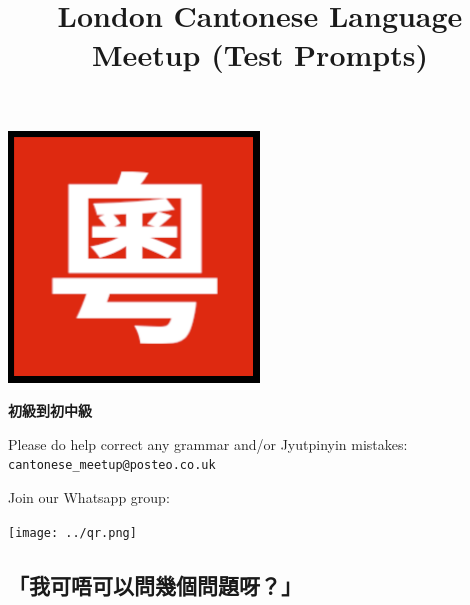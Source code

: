 \documentclass[12pt,a4paper]{leaflet}
\date{}
\title{London Cantonese Language Meetup (Test Prompts)}
\author{}
\begin{document}
\maketitle

\vspace{-2cm}

\begin{center}
\includegraphics[width=0.5\textwidth]{../logo.png}
\end{center}

\begin{center}
\textbf{\LARGE 初級到初中級}
\end{center}

Please do help correct any grammar and/or Jyutpinyin mistakes: \texttt{cantonese\_meetup@posteo.co.uk}

Join our Whatsapp group:
\begin{center}
\texttt{[image: ../qr.png]}
\end{center}

\newpage

\begin{center}
\section*{「我可唔可以問幾個問題呀？」}
\end{center}
\end{document}
